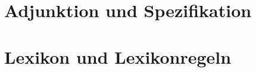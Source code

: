\documentclass[handout,aspectratio=1610,dvipsnames]{beamer}
\begin{document}
  \section{Adjunktion und Spezifikation}
  \let\woopsi\section\let\section\subsection\let\subsection\subsubsection
  
  \let\subsection\section\let\section\woopsi

  \section{Lexikon und Lexikonregeln}
  \let\woopsi\section\let\section\subsection\let\subsection\subsubsection
  
  \let\subsection\section\let\section\woopsi
\end{document}
